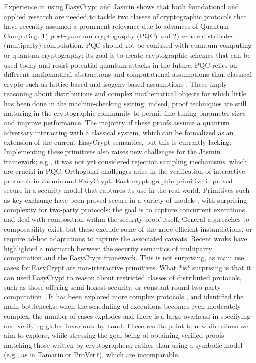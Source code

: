 \documentclass[preprint]{iacrtrans}
\begin{document}
  Experience in using EasyCrypt and Jasmin\cite{SoK} shows that both
  foundational and applied research are needed to tackle two classes of
  cryptographic protocols that have recently assumed a prominent
  relevance due to advances of Quantum Computing: 1) post-quantum
  cryptography (PQC) and 2) secure distributed (multiparty)
  computation. PQC should not be confused with quantum computing or
  quantum cryptography; its goal is to create cryptographic schemes that
  can be used today and resist potential quantum attacks in the
  future. PQC relies on different mathematical abstractions and
  computational assumptions than classical crypto such as lattice-based
  \cite{CRYS} and isogeny-based assumptions \cite{SIKE}. These imply reasoning
  about distributions and complex mathematical objects for which little
  has been done in the machine-checking setting; indeed, proof
  techniques are still maturing in the cryptographic community to permit
  fine-tuning parameter sizes and improve performance. The majority of
  these proofs assume a quantum adversary interacting with a classical
  system, which can be formalized as an extension of the current
  EasyCrypt semantics, but this is currently lacking. Implementing these
  primitives also raises new challenges for the Jasmin framework; e.g.,
  it was not yet considered rejection sampling mechanisms, which are
  crucial in PQC. Orthogonal challenges arise in the verification of
  interactive protocols in Jasmin and EasyCrypt. Each cryptographic
  primitive is proved secure in a security model that captures its use
  in the real world. Primitives such as key exchange have been proved
  secure in a variety of models \cite{KECR}, with surprising complexity for
  two-party protocols: the goal is to capture concurrent executions and
  deal with composition within the security proof itself. General
  approaches to composability \cite{UC} exist, but these exclude some of the
  more efficient instantiations, or require ad-hoc adaptations to
  capture the associated caveats.  Recent works \cite{KMS,EUC,LMPC} have
  highlighted a mismatch between the security semantics of multiparty
  computation and the EasyCrypt framework. This is not surprising, as
  main use cases for EasyCrypt are non-interactive primitives. What *is*
  surprising is that it can used EasyCrypt to reason about restricted
  classes of distributed protocols, such as those offering semi-honest
  security, or constant-round two-party computation \cite{LMPC, EUC}. It has
  been explored more complex protocols \cite{KMS}, and identified the main
  bottlenecks: when the scheduling of executions becomes even moderately
  complex, the number of cases explodes and there is a large overhead in
  specifying and verifying global invariants by hand. These results
  point to new directions we aim to explore, while stressing the goal
  being of obtaining verified proofs matching those written by
  cryptographers, rather than using a symbolic model (e.g., as in
  Tamarin or ProVerif), which are incomparable.
\end{document}
